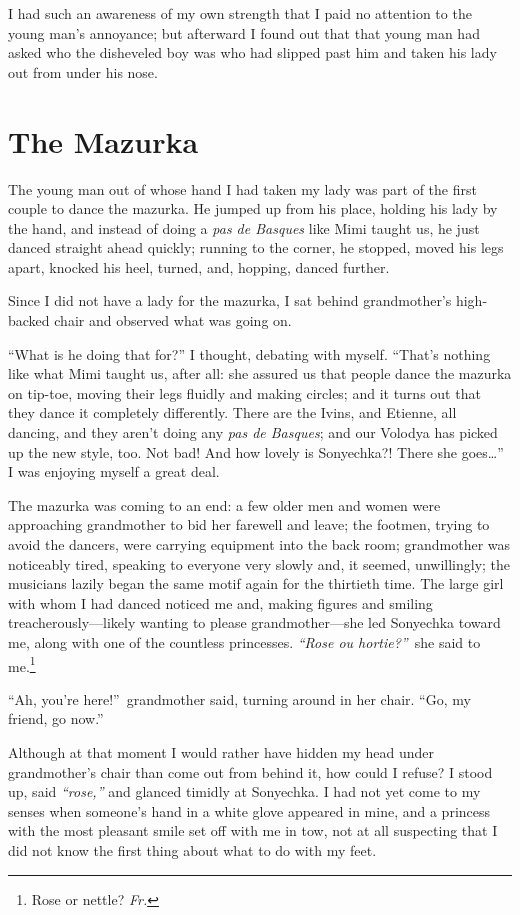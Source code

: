 I had such an awareness of my own strength that I paid no attention to the young man's annoyance; but afterward I found out that that young man had asked who the disheveled boy was who had slipped past him and taken his lady out from under his nose.

\chapter{The Mazurka} %

The young man out of whose hand I had taken my lady was part of the first couple to dance the mazurka. He jumped up from his place, holding his lady by the hand, and instead of doing a \textit{pas de Basques} like Mimi taught us, he just danced straight ahead quickly; running to the corner, he stopped, moved his legs apart, knocked his heel, turned, and, hopping, danced further.

Since I did not have a lady for the mazurka, I sat behind grandmother's high-backed chair and observed what was going on.

``What is he doing that for?'' I thought, debating with myself. ``That's nothing like what Mimi taught us, after all: she assured us that people dance the mazurka on tip-toe, moving their legs fluidly and making circles; and it turns out that they dance it completely differently. There are the Ivins, and Etienne, all dancing, and they aren't doing any \textit{pas de Basques}; and our Volodya has picked up the new style, too. Not bad! And how lovely is Sonyechka?! There she goes\ldots{}'' I was enjoying myself a great deal. %

The mazurka was coming to an end: a few older men and women were approaching grandmother to bid her farewell and leave; the footmen, trying to avoid the dancers, were carrying equipment into the back room; grandmother was noticeably tired, speaking to everyone very slowly and, it seemed, unwillingly; the musicians lazily began the same motif again for the thirtieth time. The large girl with whom I had danced noticed me and, making figures and smiling treacherously---likely wanting to please grandmother---she led Sonyechka toward me, along with one of the countless princesses. \textit{``Rose ou hortie?''}~she said to me.\footnote{Rose or nettle? \textit{Fr.}} %

``Ah, you're here!''~grandmother said, turning around in her chair. ``Go, my friend, go now.'' %

Although at that moment I would rather have hidden my head under grandmother's chair than come out from behind it, how could I refuse? I stood up, said \textit{``rose,''} and glanced timidly at Sonyechka. I had not yet come to my senses when someone's hand in a white glove appeared in mine, and a princess with the most pleasant smile set off with me in tow, not at all suspecting that I did not know the first thing about what to do with my feet.

